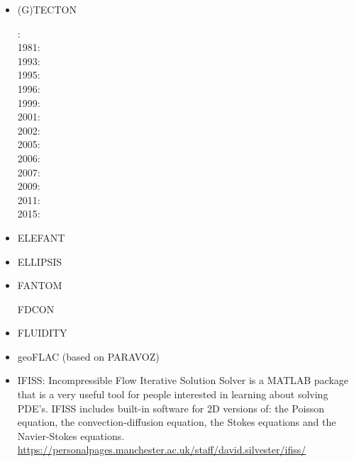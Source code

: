 \begin{itemize}
\item (G)TECTON

: \cite{mera80}\\
1981: \cite{mera81}\\
1993: \cite{gowo93}\\
1995: \cite{gowo95}\\
1996: \cite{guez96}\\
1999: \cite{gowo99}\\
2001: \cite{bugw01}\cite{gome01}\\
2002: \cite{bugw02}\\
2005: \cite{gowo05}\cite{vanw05}\cite{vabl05}\\
2006: \cite{degw06}\cite{libi06}\cite{scdm06}\\
2007: \cite{vabl07}\\
2009: \cite{ladg09}\\
2011: \cite{bagw11}\cite{bagw11b}\\
2015: \cite{mags15}

\item ELEFANT

\cite{tosn15}
\cite{matv15}
\cite{busa16}
\cite{latb17}
\cite{thie17}
\cite{pltv18}
\cite{wohu19}

\item ELLIPSIS

\cite{modm03}
\cite{omma06} 
\cite{moql07}
\cite{dyrm07}
\cite{onlg08}
\cite{pyeg10}
\cite{legu11}
\cite{lega12}
\cite{recf14}


\item FANTOM

\cite{thie11}
\cite{alht11}
\cite{alht12}
\cite{alhf13}
\cite{erhv14}
\cite{thsh14}
\cite{erhv15}
\cite{erhv19}

\index FDCON

\cite{enbs05}
\cite{fusc13}
\cite{fuks15}


\item FLUIDITY
\cite{dawk11}
\cite{gagd14}

\item geoFLAC (based on PARAVOZ)
\cite{jala19}

\item IFISS: Incompressible Flow Iterative Solution Solver is a
MATLAB package that is a very useful tool for people interested in
learning about solving PDE’s.
IFISS includes built-in software for 2D versions of:
the Poisson equation, the convection-diffusion equation, the Stokes equations
and the Navier-Stokes equations.\\
\url{https://personalpages.manchester.ac.uk/staff/david.silvester/ifiss/}




\end{itemize}
